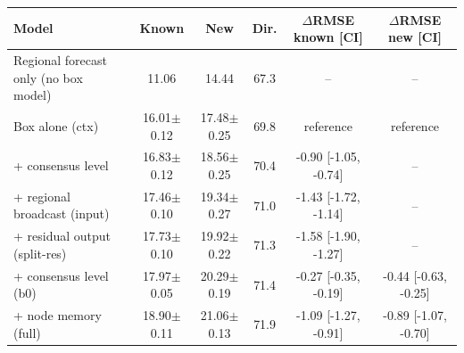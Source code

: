 \begin{tabular}{|p{4.3cm}|c|c|c|c|c|}
\hline
Model & Known & New & Dir. & $\Delta$RMSE known [CI] & $\Delta$RMSE new [CI] \\
\hline
Regional forecast only (no box model) & 11.06 & 14.44 & 67.3 & -- & -- \\
Box alone (ctx) & 16.01$\pm$0.12 & 17.48$\pm$0.25 & 69.8 & reference & reference \\
+ consensus level & 16.83$\pm$0.12 & 18.56$\pm$0.25 & 70.4 & -0.90 [-1.05, -0.74] & -- \\
+ regional broadcast (input) & 17.46$\pm$0.10 & 19.34$\pm$0.27 & 71.0 & -1.43 [-1.72, -1.14] & -- \\
+ residual output (split-res) & 17.73$\pm$0.10 & 19.92$\pm$0.22 & 71.3 & -1.58 [-1.90, -1.27] & -- \\
+ consensus level (b0) & 17.97$\pm$0.05 & 20.29$\pm$0.19 & 71.4 & -0.27 [-0.35, -0.19] & -0.44 [-0.63, -0.25] \\
+ node memory (full) & 18.90$\pm$0.11 & 21.06$\pm$0.13 & 71.9 & -1.09 [-1.27, -0.91] & -0.89 [-1.07, -0.70] \\
\hline
\end{tabular}
